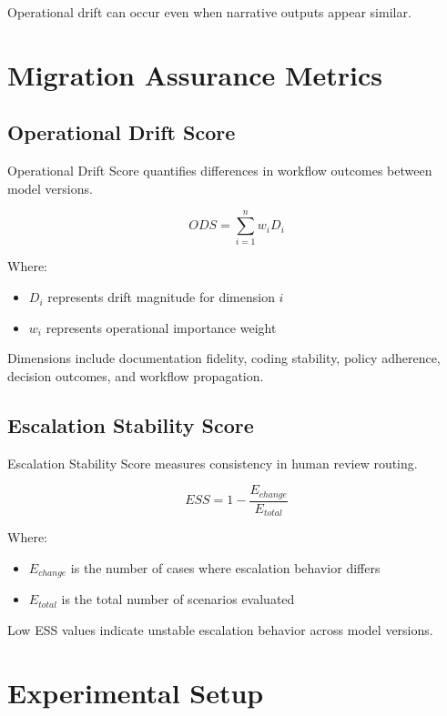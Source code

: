 \documentclass[11pt]{article}
\begin{document}
Operational drift can occur even when narrative outputs appear similar.

\section{Migration Assurance Metrics}

\subsection{Operational Drift Score}

Operational Drift Score quantifies differences in workflow outcomes between model versions.

\begin{equation}
ODS = \sum_{i=1}^{n} w_i D_i
\end{equation}

Where:

\begin{itemize}
\item $D_i$ represents drift magnitude for dimension $i$
\item $w_i$ represents operational importance weight
\end{itemize}

Dimensions include documentation fidelity, coding stability, policy adherence, decision outcomes, and workflow propagation.

\subsection{Escalation Stability Score}

Escalation Stability Score measures consistency in human review routing.

\begin{equation}
ESS = 1 - \frac{E_{change}}{E_{total}}
\end{equation}

Where:

\begin{itemize}
\item $E_{change}$ is the number of cases where escalation behavior differs
\item $E_{total}$ is the total number of scenarios evaluated
\end{itemize}

Low ESS values indicate unstable escalation behavior across model versions.

\section{Experimental Setup}
\end{document}
